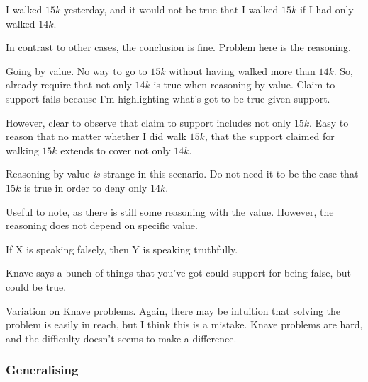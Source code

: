 \begin{note}[Problematic]
  \begin{scenario}
    I walked \(15k\) yesterday, and it would not be true that I walked \(15k\) if I had only walked \(14k\).
  \end{scenario}
  In contrast to other cases, the conclusion is fine.
  Problem here is the reasoning.

  Going by value.
  No way to go to \(15k\) without having walked more than \(14k\).
  So, already require that not only \(14k\) is true when reasoning-by-value.
  Claim to support fails because I'm highlighting what's got to be true given support.

  However, clear to observe that claim to support includes not only \(15k\).
  Easy to reason that no matter whether I did walk \(15k\), that the support claimed for walking \(15k\) extends to cover not only \(14k\).

  Reasoning-by-value \emph{is} strange in this scenario.
  Do not need it to be the case that \(15k\) is true in order to deny only \(14k\).


  Useful to note, as there is still some reasoning with the value.
  However, the reasoning does not depend on specific value.
\end{note}

\begin{note}[Knaves]
  \begin{scenario}
    If X is speaking falsely, then Y is speaking truthfully.

    Knave says a bunch of things that you've got could support for being false, but could be true.
  \end{scenario}
  Variation on Knave problems.
  Again, there may be intuition that solving the problem is easily in reach, but I think this is a mistake.
  Knave problems are hard, and the difficulty doesn't seems to make a difference.
\end{note}

\subsubsection{Generalising \nI{}}
\label{sec:generalising-ni}

